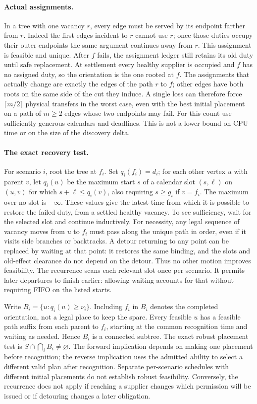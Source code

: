 \documentclass[11pt]{article}
\begin{document}
\paragraph{Actual assignments.}
In a tree with one vacancy $r$, every edge must be served by its endpoint farther from $r$. Indeed the first edges incident to $r$ cannot use $r$; once those duties occupy their outer endpoints the same argument continues away from $r$. This assignment is feasible and unique. After $f$ fails, the assignment ledger still retains its old duty until safe replacement. At settlement every healthy supplier is occupied and $f$ has no assigned duty, so the orientation is the one rooted at $f$. The assignments that actually change are exactly the edges of the path $r$ to $f$; other edges have both roots on the same side of the cut they induce. A single loss can therefore force $\lceil m/2\rceil$ physical transfers in the worst case, even with the best initial placement on a path of $m\geq 2$ edges whose two endpoints may fail. For this count use sufficiently generous calendars and deadlines. This is not a lower bound on CPU time or on the size of the discovery delta.

\paragraph{The exact recovery test.}
For scenario $i$, root the tree at $f_i$. Set $q_i(f_i)=d_i$; for each other vertex $u$ with parent $v$, let $q_i(u)$ be the maximum start $s$ of a calendar slot $(s,\ell)$ on $(u,v)$ for which $s+\ell\leq q_i(v)$, also requiring $s\geq g_i$ if $v=f_i$. The maximum over no slot is $-\infty$. These values give the latest time from which it is possible to restore the failed duty, from a settled healthy vacancy. To see sufficiency, wait for the selected slot and continue inductively. For necessity, any legal sequence of vacancy moves from $u$ to $f_i$ must pass along the unique path in order, even if it visits side branches or backtracks. A detour returning to any point can be replaced by waiting at that point: it restores the same binding, and the slots and old-effect clearance do not depend on the detour. Thus no other motion improves feasibility. The recurrence scans each relevant slot once per scenario. It permits later departures to finish earlier: allowing waiting accounts for that without requiring FIFO on the listed starts.

Write $B_i=\{u:q_i(u)\geq\nu_i\}$. Including $f_i$ in $B_i$ denotes the completed orientation, not a legal place to keep the spare. Every feasible $u$ has a feasible path suffix from each parent to $f_i$, starting at the common recognition time and waiting as needed. Hence $B_i$ is a connected subtree. The exact robust placement test is $S\cap\bigcap_i B_i\ne\varnothing$. The forward implication depends on making one placement before recognition; the reverse implication uses the admitted ability to select a different valid plan after recognition. Separate per-scenario schedules with different initial placements do not establish robust feasibility. Conversely, the recurrence does not apply if reaching a supplier changes which permission will be issued or if detouring changes a later obligation.
\end{document}
